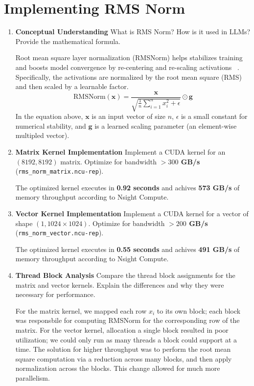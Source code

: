 \documentclass[12pt]{article}
\begin{document}
\section{Implementing RMS Norm}

\begin{enumerate}[label=\textbf{Q\arabic*.}]
    \item \textbf{Conceptual Understanding}
    What is RMS Norm? How is it used in LLMs? Provide the mathematical formula.

    Root mean square layer normalization (RMSNorm) helps stabilizes training and boosts model convergence by re-centering and re-scaling activations ~\cite{rmsnorm}. Specifically, the activations are normalized by the root mean square (RMS) and then scaled by a learnable factor.
    \begin{equation}
        \text{RMSNorm}\left(\textbf{x}\right) = \frac{\textbf{x}}{\sqrt{\frac{1}{n} \sum_{i=1}^n x_i^2 + \epsilon}} \odot \textbf{g}
    \end{equation}
    In the equation above, $\textbf{x}$ is an input vector of size $n$, $\epsilon$ is a small constant for numerical stability, and $\textbf{g}$ is a learned scaling parameter (an element-wise multipled vector).


    \item \textbf{Matrix Kernel Implementation}
    Implement a CUDA kernel for an $(8192, 8192)$ matrix. Optimize for bandwidth \textbf{$> 300$ GB/s} (\texttt{rms\_norm\_matrix.ncu-rep}).

    The optimized kernel executes in \textbf{0.92 seconds} and achives \textbf{573 GB/s} of memory throughput according to Nsight Compute.

    \item \textbf{Vector Kernel Implementation}
    Implement a CUDA kernel for a vector of shape $(1, 1024 \times 1024)$. Optimize for bandwidth \textbf{$> 200$ GB/s} (\texttt{rms\_norm\_vector.ncu-rep}).

    The optimized kernel executes in \textbf{0.55 seconds} and achives \textbf{491 GB/s} of memory throughput according to Nsight Compute.

    \item \textbf{Thread Block Analysis}
    Compare the thread block assignments for the matrix and vector kernels. Explain the differences and why they were necessary for performance.

    For the matrix kernel, we mapped each row $x_i$ to its own block; each block was responsbile for computing RMSNorm for the corresponding row of the matrix. For the vector kernel, allocation a single block resulted in poor utilization; we could only run as many threads a block could support at a time. The solution for higher throughput was to perform the root mean square computation via a reduction across many blocks, and then apply normalization across the blocks. This change allowed for much more parallelism.

\end{enumerate}
\end{document}
